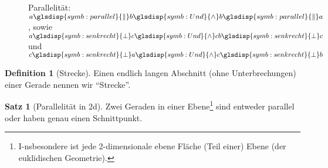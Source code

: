 \documentclass[a4paper]{book}%
\theoremstyle{definition}
\newtheorem{definition}{Definition}
\newtheorem{satz}{Satz}
\begin{document}
\begin{figure}
  \centering
    $\quad$

  \caption{Parallelität: $a \glsdisp{symb:parallel}{\|} b \glsdisp{symb:Und}{\wedge} b \glsdisp{symb:parallel}{\|} a$, sowie $a \glsdisp{symb:senkrecht}{\bot} c \glsdisp{symb:Und}{\wedge} c b \glsdisp{symb:senkrecht}{\bot} c$ und $c \glsdisp{symb:senkrecht}{\bot} a \glsdisp{symb:Und}{\wedge} c \glsdisp{symb:senkrecht}{\bot} b$}\label{fig:Parallelitaet}
\end{figure}



\begin{definition}[Strecke]\label{def:Strecke}
    Einen endlich langen Abschnitt (ohne Unterbrechungen) einer Gerade nennen wir \enquote{Strecke}.
\end{definition}

\begin{satz}[Parallelität in 2d]\label{def:Parallele}
    Zwei Geraden in einer Ebene\footnote{I-nsbesondere ist jede 2-dimensionale ebene Fläche (Teil einer) Ebene (der euklidischen Geometrie).} sind entweder parallel oder haben genau einen Schnittpunkt.
\end{satz}
\end{document}
